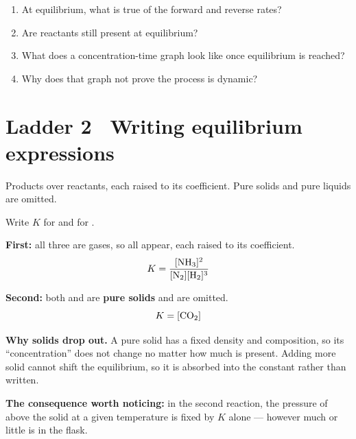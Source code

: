 \documentclass{apchem-worksheet}
\begin{document}
\begin{yourturn}
\begin{enumerate}[leftmargin=*,itemsep=0.5em]
  \item At equilibrium, what is true of the forward and reverse rates?
        \workspace[1.4cm]
  \item Are reactants still present at equilibrium? \workspace[1.4cm]
  \item What does a concentration-time graph look like once equilibrium is
        reached? \workspace[1.6cm]
  \item Why does that graph not prove the process is dynamic?
        \workspace[1.8cm]
\end{enumerate}
\end{yourturn}

\section*{\sffamily Ladder 2 \textbullet\ Writing equilibrium expressions}

Products over reactants, each raised to its coefficient. Pure solids and
pure liquids are omitted.

\begin{workedexample}
Write $K$ for
 and for
.

\textbf{First:} all three are gases, so all appear, each raised to its
coefficient.
\[ K = \frac{[\ce{NH3}]^2}{[\ce{N2}][\ce{H2}]^3} \]

\textbf{Second:} both  and  are \textbf{pure solids} and
are omitted.
\[ K = [\ce{CO2}] \]

\textbf{Why solids drop out.} A pure solid has a fixed density and
composition, so its ``concentration'' does not change no matter how much
is present. Adding more solid cannot shift the equilibrium, so it is
absorbed into the constant rather than written.

\textbf{The consequence worth noticing:} in the second reaction, the
pressure of  above the solid at a given temperature is fixed by
$K$ alone --- however much or little  is in the flask.
\end{workedexample}
\end{document}
